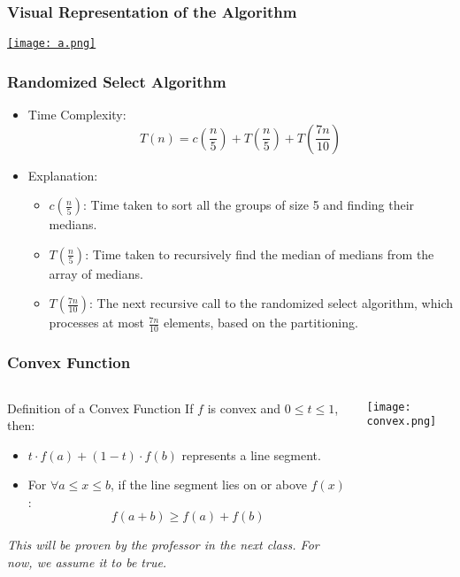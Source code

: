 \begin{frame}
    \frametitle{Visual Representation of the Algorithm}
    \begin{center}
        \href{https://drive.google.com/file/d/1SaXqVaz6IKVs5eATkncYFpq6uDMj4Q3e/view?usp=drive_link}{\texttt{[image: a.png]}}
    \end{center}
\end{frame}

\begin{frame}
    \frametitle{Randomized Select Algorithm}
    \begin{itemize}
        \item Time Complexity:
        \[
        T(n) = c\left(\frac{n}{5}\right) + T\left(\frac{n}{5}\right) + T\left(\frac{7n}{10}\right)
        \]
        \item Explanation:
        \begin{itemize}
            \item \(c\left(\frac{n}{5}\right)\): Time taken to sort all the groups of size 5 and finding their medians.
            \vspace{0.4cm}
            \item \(T\left(\frac{n}{5}\right)\): Time taken to recursively find the median of medians from the array of medians.
            \vspace{0.2cm}
            \item \(T\left(\frac{7n}{10}\right)\): The next recursive call to the randomized select algorithm, which processes at most \( \frac{7n}{10} \) elements, based on the partitioning.
        \end{itemize}
        
    \end{itemize}
\end{frame}
\begin{frame}
    \frametitle{Convex Function}
    \vspace{0.3cm}

    \begin{columns}
        \begin{block}{Definition of a Convex Function}
            If $f$ is convex and $0 \leq t \leq 1$, then:
            \begin{itemize}
                \item $t \cdot f(a) + (1-t) \cdot f(b)$ represents a line segment.
                \item For \( \forall a \leq x \leq b \), if the line segment lies on or above $f(x)$:
                \[
                f(a+b) \geq f(a) + f(b) \tag{Eq. 1}
                \]
            \end{itemize}
            \textit{This will be proven by the professor in the next class. For now, we assume it to be true.}
        \end{block}

        \centering
        \texttt{[image: convex.png]}
        
    \end{columns}
\end{frame}
